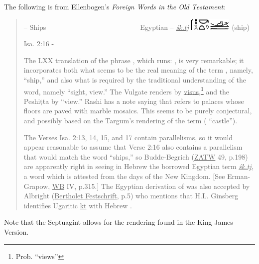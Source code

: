 The following is from Ellenbogen's \textit{Foreign Words in the Old Testament}:
\begin{quotation}
    {\noindent{} -- Ships~~~~~~~~~~~~~~~~~~~~~~~~~~~Egyptian -- \uline{\textit{\'sk.tj}} \includegraphics[scale=1.1]{images/egt-ship} (ship)}
    
    {\noindent Isa. 2:16 -}
    
    The LXX translation of the phrase , which runs: , is very remarkable; it incorporates both what seems to be the real meaning of the term , namely,  ``ship,'' and also what is required by the traditional understanding of the word, namely  ``sight, view.'' The Vulgate renders  by \uline{visus},\footnote{Prob. ``views''} and the Peshi\d{t}ta by  ``view.'' Rashi has a note saying that  refers to palaces whose floors are paved with marble mosaics. This seems to be purely conjectural, and possibly based on the Targum's rendering of the term ( ``castle'').
    
    The Verses Isa. 2:13, 14, 15, and 17 contain parallelisms, so it would appear reasonable to assume that Verse 2:16 also contains a parallelism that would match the word  ``ships,'' so Budde-Begrich (\uline{ZATW} 49, p.198) are apparently right in seeing in Hebrew  the borrowed Egyptian term \uline{\textit{\'sk.tj}}, a word which is attested from the days of the New Kingdom. [See Erman-Grapow, \uline{WB} IV, p.315.] The Egyptian derivation of  was also accepted by Albright (\uline{Bertholet Festschrift}, p.5) who mentions that H.L. Ginsberg identifies Ugaritic \uline{kt} with Hebrew .
\end{quotation}

Note that the Septuagint allows for the rendering found in the King James Version.
